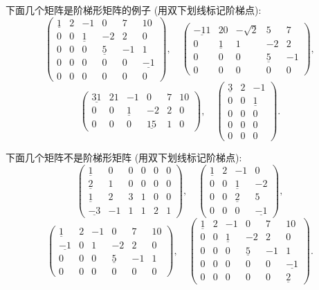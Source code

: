 \documentclass[UTF8,12pt,a4paper,fontset=fandol]{ctexart}
\begin{document}
下面几个矩阵是阶梯形矩阵的例子 (用双下划线标记阶梯点):
\[
\left(\begin{array}{cccccc}
\underline{1} & 2 & -1 & 0 & 7 & 10\\
0 & 0 & \underline{1} & -2 & 2 & 0\\
0 & 0 & 0 & \underline{5} & -1 & 1\\
0 & 0 & 0 & 0 & 0 & \underline{-1}\\
0 & 0 & 0 & 0 & 0 & 0
\end{array}\right),\quad
\left(\begin{array}{ccccc}
\underline{-11} & 20 & -\sqrt{2} & 5 & 7\\
0 & \underline{1} & 1 & -2 & 2\\
0 & 0 & 0 & \underline{5} & -1\\
0 & 0 & 0 & 0 & 0
\end{array}\right),
\]
\[
\left(\begin{array}{cccccc}
\underline{31} & 21 & -1 & 0 & 7 & 10\\
0 & 0 & \underline{1} & -2 & 2 & 0\\
0 & 0 & 0 & \underline{15} & 1 & 0
\end{array}\right),\quad
\left(\begin{array}{ccc}
\underline{3} & 2 & -1\\
0 & 0 & \underline{1}\\
0 & 0 & 0\\
0 & 0 & 0\\
0 & 0 & 0
\end{array}\right).
\]

下面几个矩阵不是阶梯形矩阵 (用双下划线标记阶梯点):
\[
\left(\begin{array}{cccccc}
\underline{1} & 0 & 0 & 0 & 0 & 0\\
\underline{2} & 1 & 0 & 0 & 0 & 0\\
\underline{1} & 2 & 3 & 1 & 0 & 0\\
\underline{-3} & -1 & 1 & 1 & 2 & 1
\end{array}\right),\quad
\left(\begin{array}{cccc}
\underline{1} & 2 & -1 & 0\\
0 & 0 & \underline{1} & -2\\
0 & 0 & \underline{2} & 5\\
0 & 0 & 0 & \underline{-1}
\end{array}\right),
\]
\[
\left(\begin{array}{cccccc}
\underline{1} & 2 & -1 & 0 & 7 & 10\\
\underline{-1} & 0 & 1 & -2 & 2 & 0\\
0 & 0 & 0 & \underline{5} & -1 & 1\\
0 & 0 & 0 & 0 & 0 & 0
\end{array}\right),\quad
\left(\begin{array}{cccccc}
\underline{1} & 2 & -1 & 0 & 7 & 10\\
0 & 0 & \underline{1} & -2 & 2 & 0\\
0 & 0 & 0 & \underline{5} & -1 & 1\\
0 & 0 & 0 & 0 & 0 & \underline{-1}\\
0 & 0 & 0 & 0 & 0 & \underline{2}
\end{array}\right).
\]
\end{document}
